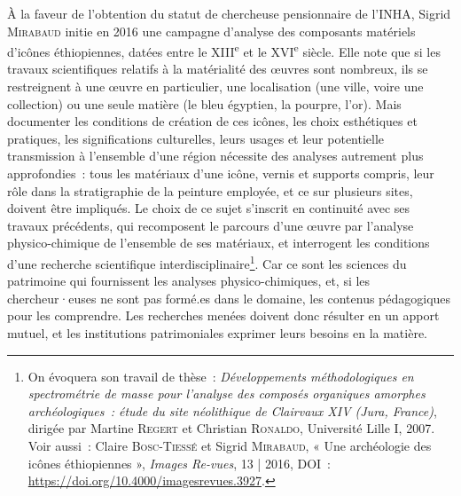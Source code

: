 \documentclass[a4paper,12pt, twoside]{book}
\begin{document}
À la faveur de l’obtention du statut de chercheuse pensionnaire de l’INHA, Sigrid \textsc{Mirabaud} initie en 2016 une campagne d’analyse des composants matériels d’icônes éthiopiennes, datées entre le XIII\textsuperscript{e} et le XVI\textsuperscript{e} siècle. Elle note que si les travaux scientifiques relatifs à la matérialité des œuvres sont nombreux, ils se restreignent à une œuvre en particulier, une localisation (une ville, voire une collection) ou une seule matière (le bleu égyptien, la pourpre, l’or). Mais documenter les conditions de création de ces icônes, les choix esthétiques et pratiques, les significations culturelles, leurs usages et leur potentielle transmission à l’ensemble d’une région nécessite des analyses autrement plus approfondies~: tous les matériaux d’une icône, vernis et supports compris, leur rôle dans la stratigraphie de la peinture employée, et ce sur plusieurs sites, doivent être impliqués. Le choix de ce sujet s’inscrit en continuité avec ses travaux précédents, qui recomposent le parcours d’une œuvre par l’analyse physico-chimique de l’ensemble de ses matériaux, et interrogent les conditions d’une recherche scientifique interdisciplinaire\footnote{On évoquera son travail de thèse~: \textit{Développements méthodologiques en spectrométrie de masse pour l'analyse des composés organiques amorphes archéologiques~: étude du site néolithique de Clairvaux XIV (Jura, France)}, dirigée par Martine \textsc{Regert} et Christian \textsc{Ronaldo}, Université Lille I, 2007. Voir aussi~: Claire \textsc{Bosc-Tiessé} et Sigrid \textsc{Mirabaud}, « Une archéologie des icônes éthiopiennes », \textit{Images Re-vues}, 13 | 2016, DOI~: \url{https://doi.org/10.4000/imagesrevues.3927}.}. Car ce sont les sciences du patrimoine qui fournissent les analyses physico-chimiques, et, si les chercheur·euses ne sont pas formé.es dans le domaine, les contenus pédagogiques pour les comprendre. Les recherches menées doivent donc résulter en un apport mutuel, et les institutions patrimoniales exprimer leurs besoins en la matière.
\end{document}
